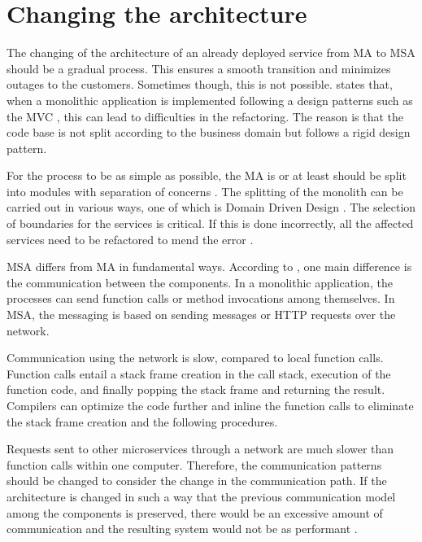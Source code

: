 \section{Changing the architecture}
\begin{sloppypar}
    The changing of the architecture of an already deployed service from MA to
    MSA should be a gradual process. This ensures a smooth transition and
    minimizes outages to the customers. Sometimes though, this is not possible.
    \citet{newman2019} states that, when a monolithic application is implemented
    following a design patterns such as the MVC \citep{trygvemvc}, this can lead
    to difficulties in the refactoring. The reason is that the code base is not
    split according to the business domain but follows a rigid design pattern.
\end{sloppypar}
\begin{sloppypar}
    For the process to be as simple as possible, the MA is or at least should be
    split into modules with separation of concerns \citep{secchalmsa}. The
    splitting of the monolith can be carried out in various ways, one of which
    is Domain Driven Design \citep{evans2003}. The selection of boundaries for
    the services is critical. If this is done incorrectly, all the affected
    services need to be refactored to mend the error \citep{newman2019}.
\end{sloppypar}
\begin{sloppypar}
    MSA differs from MA in fundamental ways. According to \citet{fowlerlewisms},
    one main difference is the communication between the components. In a
    monolithic application, the processes can send function calls or method
    invocations among themselves. In MSA, the messaging is based on sending
    messages or HTTP requests over the network. 
\end{sloppypar}
\begin{sloppypar}
    Communication using the network is slow, compared to local function calls.
    Function calls entail a stack frame creation in the call stack, execution of
    the function code, and finally popping the stack frame and returning the
    result. Compilers can optimize the code further and inline the function
    calls to eliminate the stack frame creation and the following procedures.
\end{sloppypar}
\begin{sloppypar}
    Requests sent to other microservices through a network are much slower than
    function calls within one computer. Therefore, the communication patterns
    should be changed to consider the change in the communication path. If the
    architecture is changed in such a way that the previous communication model
    among the components is preserved, there would be an excessive amount of
    communication and the resulting system would not be as performant
    \citep{fowlerlewisms}. 
\end{sloppypar}

